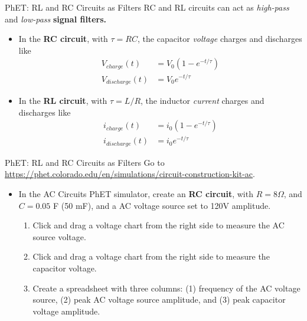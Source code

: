 \documentclass{beamer}
\begin{document}
\begin{frame}{PhET: RL and RC Circuits as Filters}
\small
RC and RL circuits can act as \textit{high-pass} and \textit{low-pass} \textbf{\alert{signal filters.}}
\begin{itemize}
\item In the \textbf{\alert{RC circuit}}, with $\tau = RC$, the capacitor \textit{voltage} charges and discharges like
\begin{align}
V_{charge}(t) &= V_0 \left(1 - e^{-t/\tau}\right) \\
V_{discharge}(t) &= V_0 e^{-t/\tau}
\end{align}
\item In the \textbf{\alert{RL circuit}}, with $\tau = L/R$, the inductor \textit{current} charges and discharges like
\begin{align}
i_{charge}(t) &= i_0 \left(1 - e^{-t/\tau}\right) \\
i_{discharge}(t) &= i_0 e^{-t/\tau}
\end{align}
\end{itemize}
\end{frame}

\begin{frame}{PhET: RL and RC Circuits as Filters}
\footnotesize
Go to \url{https://phet.colorado.edu/en/simulations/circuit-construction-kit-ac}.
\begin{itemize}
\footnotesize
\item In the AC Circuits PhET simulator, create an \textbf{\alert{RC circuit}}, with $R = 8 \Omega$, and $C = 0.05$ F (50 mF), and a AC voltage source set to 120V amplitude.
\begin{enumerate}
\footnotesize
\item Click and drag a voltage chart from the right side to measure the AC source voltage.
\item Click and drag a voltage chart from the right side to measure the capacitor voltage.
\item Create a spreadsheet with three columns: (1) frequency of the AC voltage source, (2) peak AC voltage source amplitude, and (3) peak capacitor voltage amplitude.
\end{enumerate}
\end{itemize}
\end{frame}
\end{document}

